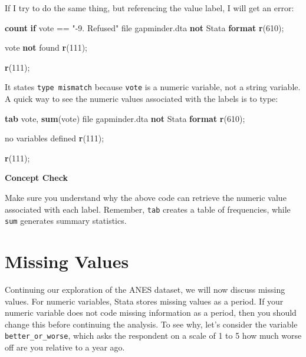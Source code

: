 \documentclass[
]{book}
\newenvironment{Shaded}{\begin{snugshade}}{\end{snugshade}}
\newcommand{\FunctionTok}[1]{\textcolor[rgb]{0.13,0.29,0.53}{\textbf{#1}}}
\newcommand{\KeywordTok}[1]{\textcolor[rgb]{0.13,0.29,0.53}{\textbf{#1}}}
\newcommand{\NormalTok}[1]{#1}
\newcommand{\StringTok}[1]{\textcolor[rgb]{0.31,0.60,0.02}{#1}}
\begin{document}
If I try to do the same thing, but referencing the value label, I will get an error:

\begin{Shaded}
\begin{Highlighting}[]
\FunctionTok{count} \KeywordTok{if}\NormalTok{ vote == }\StringTok{"{-}9. Refused"}
\NormalTok{file gapminder.dta }\KeywordTok{not}\NormalTok{ Stata }\KeywordTok{format}
\FunctionTok{r}\NormalTok{(610);}


\NormalTok{vote }\KeywordTok{not}\NormalTok{ found}
\FunctionTok{r}\NormalTok{(111);}

\FunctionTok{r}\NormalTok{(111);}
\end{Highlighting}
\end{Shaded}

It states \texttt{type\ mismatch} because \texttt{vote} is a numeric variable, not a string variable. A quick way to see the numeric values associated with the labels is to type:

\begin{Shaded}
\begin{Highlighting}[]
\KeywordTok{tab}\NormalTok{ vote, }\KeywordTok{sum}\NormalTok{(vote)}
\NormalTok{file gapminder.dta }\KeywordTok{not}\NormalTok{ Stata }\KeywordTok{format}
\FunctionTok{r}\NormalTok{(610);}


\NormalTok{no variables defined}
\FunctionTok{r}\NormalTok{(111);}

\FunctionTok{r}\NormalTok{(111);}
\end{Highlighting}
\end{Shaded}

\textbf{Concept Check}

Make sure you understand why the above code can retrieve the numeric value associated with each label. Remember, \texttt{tab} creates a table of frequencies, while \texttt{sum} generates summary statistics.

\section{Missing Values}\label{missing-values}

Continuing our exploration of the ANES dataset, we will now discuss missing values. For numeric variables, Stata stores missing values as a period. If your numeric variable does not code missing information as a period, then you should change this before continuing the analysis. To see why, let's consider the variable \texttt{better\_or\_worse}, which asks the respondent on a scale of 1 to 5 how much worse off are you relative to a year ago.
\end{document}
